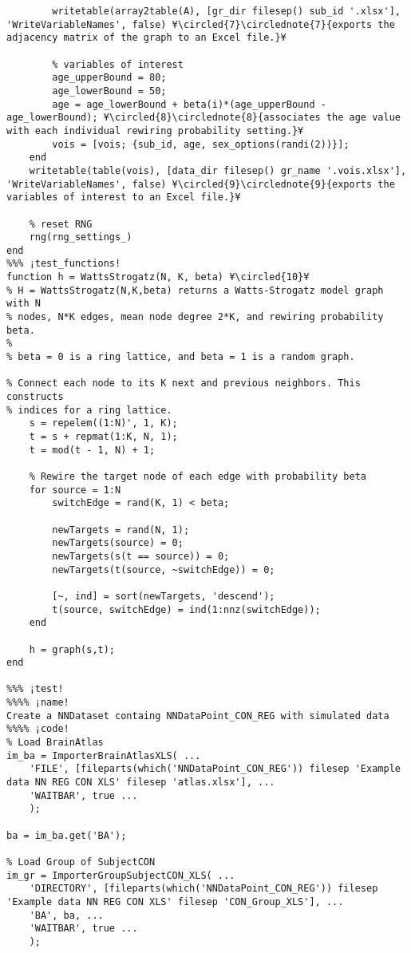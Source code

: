\documentclass{tufte-handout}
\begin{document}
\begin{lstlisting}
        writetable(array2table(A), [gr_dir filesep() sub_id '.xlsx'], 'WriteVariableNames', false) ¥\circled{7}\circlednote{7}{exports the adjacency matrix of the graph to an Excel file.}¥

        % variables of interest
        age_upperBound = 80;
        age_lowerBound = 50;
        age = age_lowerBound + beta(i)*(age_upperBound - age_lowerBound); ¥\circled{8}\circlednote{8}{associates the age value with each individual rewiring probability setting.}¥
        vois = [vois; {sub_id, age, sex_options(randi(2))}];
    end
    writetable(table(vois), [data_dir filesep() gr_name '.vois.xlsx'], 'WriteVariableNames', false) ¥\circled{9}\circlednote{9}{exports the variables of interest to an Excel file.}¥

    % reset RNG
    rng(rng_settings_)
end
%%% ¡test_functions!
function h = WattsStrogatz(N, K, beta) ¥\circled{10}¥
% H = WattsStrogatz(N,K,beta) returns a Watts-Strogatz model graph with N
% nodes, N*K edges, mean node degree 2*K, and rewiring probability beta.
%
% beta = 0 is a ring lattice, and beta = 1 is a random graph.

% Connect each node to its K next and previous neighbors. This constructs
% indices for a ring lattice.
    s = repelem((1:N)', 1, K);
    t = s + repmat(1:K, N, 1);
    t = mod(t - 1, N) + 1;
    
    % Rewire the target node of each edge with probability beta
    for source = 1:N
        switchEdge = rand(K, 1) < beta;
        
        newTargets = rand(N, 1);
        newTargets(source) = 0;
        newTargets(s(t == source)) = 0;
        newTargets(t(source, ~switchEdge)) = 0;
        
        [~, ind] = sort(newTargets, 'descend');
        t(source, switchEdge) = ind(1:nnz(switchEdge));
    end
    
    h = graph(s,t);
end

%%% ¡test! 
%%%% ¡name!
Create a NNDataset containg NNDataPoint_CON_REG with simulated data
%%%% ¡code!
% Load BrainAtlas
im_ba = ImporterBrainAtlasXLS( ...
    'FILE', [fileparts(which('NNDataPoint_CON_REG')) filesep 'Example data NN REG CON XLS' filesep 'atlas.xlsx'], ...
    'WAITBAR', true ...
    );

ba = im_ba.get('BA');

% Load Group of SubjectCON
im_gr = ImporterGroupSubjectCON_XLS( ...
    'DIRECTORY', [fileparts(which('NNDataPoint_CON_REG')) filesep 'Example data NN REG CON XLS' filesep 'CON_Group_XLS'], ...
    'BA', ba, ...
    'WAITBAR', true ...
    );


\end{lstlisting}
\end{document}
